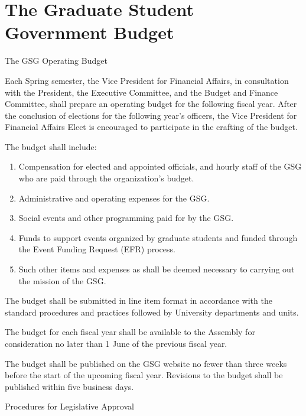 \section{The Graduate Student Government Budget}
\begin{bylaws-number}
  \item The GSG Operating Budget
  \begin{bylaws-number}
    \item Each Spring semester, the Vice President for Financial Affairs, in consultation with the President, the Executive Committee, and the Budget and Finance Committee, shall prepare an operating budget for the following fiscal year. After the conclusion of elections for the following year’s officers, the Vice President for Financial Affairs Elect is encouraged to participate in the crafting of the budget.
    \item The budget shall include:
    \begin{enumerate}[i]
      \item Compensation for elected and appointed officials, and hourly staff of the GSG who are paid through the organization’s budget.
      \item Administrative and operating expenses for the GSG.
      \item Social events and other programming paid for by the GSG.
      \item Funds to support events organized by graduate students and funded through the Event Funding Request (EFR) process.
      \item Such other items and expenses as shall be deemed necessary to carrying out the mission of the GSG.
    \end{enumerate}
    \item The budget shall be submitted in line item format in accordance with the standard procedures and practices followed by University departments and units.
    \item The budget for each fiscal year shall be available to the Assembly for consideration no later than 1 June of the previous fiscal year.
    \item The budget shall be published on the GSG website no fewer than three weeks before the start of the upcoming fiscal year. Revisions to the budget shall be published within five business days.
  \end{bylaws-number}
  \item Procedures for Legislative Approval
  \begin{bylaws-number}

\end{bylaws-number}
\end{bylaws-number}
